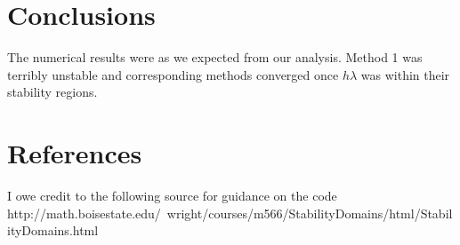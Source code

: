\documentclass[12pt]{article}
\theoremstyle{remark}
\begin{document}
\section{Conclusions}

The numerical results were as we expected from our analysis. Method 1 was terribly unstable and corresponding methods converged once $h\lambda$ was within their stability regions.

\section{References}

I owe credit to the following source for guidance on the code \\

http://math.boisestate.edu/~wright/courses/m566/StabilityDomains/html/StabilityDomains.html
\end{document}
